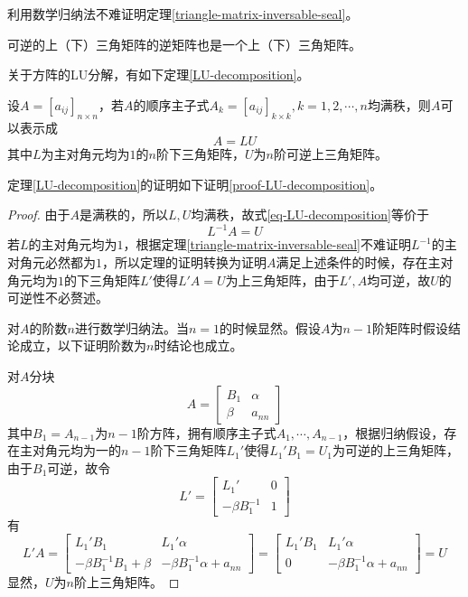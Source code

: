 利用数学归纳法不难证明定理\ref{triangle-matrix-inversable-seal}。

\begin{thm}
    \label{triangle-matrix-inversable-seal}
    可逆的上（下）三角矩阵的逆矩阵也是一个上（下）三角矩阵。
\end{thm}

关于方阵的LU分解，有如下定理\ref{LU-decomposition}。

\begin{thm}
    \label{LU-decomposition}
    设$A=[a_{ij}]_{n\times n}$，若$A$的顺序主子式$A_k=[a_{ij}]_{k\times k},k=1,2,\cdots,n$均满秩，则$A$可以表示成
    \begin{equation}
        A=LU\label{eq-LU-decomposition}
    \end{equation}
    其中$L$为主对角元均为$1$的$n$阶下三角矩阵，$U$为$n$阶可逆上三角矩阵。
\end{thm}

定理\ref{LU-decomposition}的证明如下证明\ref{proof-LU-decomposition}。

\begin{proof}
    \label{proof-LU-decomposition}
    由于$A$是满秩的，所以$L,U$均满秩，故式\ref{eq-LU-decomposition}等价于
    \[
        L^{-1}A=U
    \]
    若$L$的主对角元均为$1$，根据定理\ref{triangle-matrix-inversable-seal}不难证明$L^{-1}$的主对角元必然都为$1$，所以定理的证明转换为证明$A$满足上述条件的时候，存在主对角元均为$1$的下三角矩阵$L'$使得$L'A=U$为上三角矩阵，由于$L',A$均可逆，故$U$的可逆性不必赘述。

    对$A$的阶数$n$进行数学归纳法。当$n=1$的时候显然。假设$A$为$n-1$阶矩阵时假设结论成立，以下证明阶数为$n$时结论也成立。

    对$A$分块
    \[
        A=\begin{bmatrix}
            B_1 & \alpha \\ \beta & a_{nn}
        \end{bmatrix}
    \]
    其中$B_1=A_{n-1}$为$n-1$阶方阵，拥有顺序主子式$A_1,\cdots,A_{n-1}$，根据归纳假设，存在主对角元均为一的$n-1$阶下三角矩阵$L_1'$使得$L_1'B_1=U_1$为可逆的上三角矩阵，由于$B_1$可逆，故令
    \[
        L'=\begin{bmatrix}
            L_1' & 0 \\ -\beta B_1^{-1} & 1
        \end{bmatrix}
    \]
    有
    \[
        L'A=\begin{bmatrix}
            L_1'B_1 & L_1'\alpha \\
            -\beta B_1^{-1}B_1+\beta & -\beta B_1^{-1}\alpha+a_{nn}
        \end{bmatrix}=\begin{bmatrix}
            L_1'B_1 & L_1'\alpha \\
            0 & -\beta B_1^{-1}\alpha+a_{nn}
        \end{bmatrix}=U
    \]
    显然，$U$为$n$阶上三角矩阵。
\end{proof}
